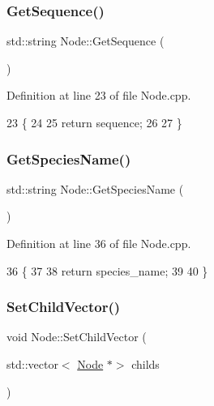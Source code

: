 \subsubsection{\texorpdfstring{Get\+Sequence()}{GetSequence()}}
{\footnotesize\ttfamily std\+::string Node\+::\+Get\+Sequence (\begin{DoxyParamCaption}{ }\end{DoxyParamCaption})}



Definition at line 23 of file Node.\+cpp.


\begin{DoxyCode}
23                            \{
24   
25   \textcolor{keywordflow}{return} sequence;  
26   
27 \}
\end{DoxyCode}
\mbox{\label{classNode_a9787fabf589f2b0764482b41091f775b}} 
\subsubsection{\texorpdfstring{Get\+Species\+Name()}{GetSpeciesName()}}
{\footnotesize\ttfamily std\+::string Node\+::\+Get\+Species\+Name (\begin{DoxyParamCaption}{ }\end{DoxyParamCaption})}



Definition at line 36 of file Node.\+cpp.


\begin{DoxyCode}
36                               \{
37   
38   \textcolor{keywordflow}{return} species\_name;
39   
40 \}
\end{DoxyCode}
\mbox{\label{classNode_a7480924f7879b04fe8c787f42ee888fe}} 
\subsubsection{\texorpdfstring{Set\+Child\+Vector()}{SetChildVector()}}
{\footnotesize\ttfamily void Node\+::\+Set\+Child\+Vector (\begin{DoxyParamCaption}\item[{std\+::vector$<$ \hyperlink{classNode}{Node} $\ast$$>$}]{childs }\end{DoxyParamCaption})}



